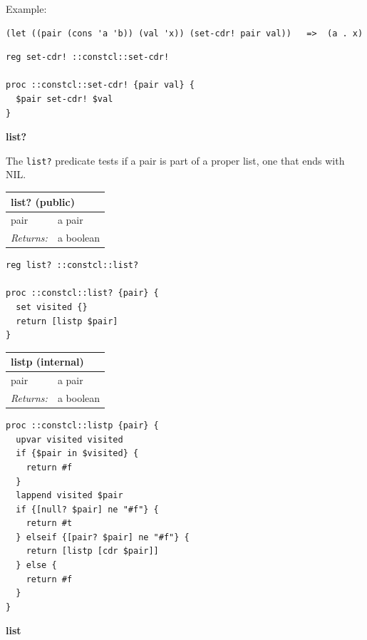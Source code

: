 \documentclass[twoside,9pt]{report}
\begin{document}
Example:

\noindent\makebox[\linewidth]{\rule{\linewidth}{0.4pt}}
\begin{lstlisting}
(let ((pair (cons 'a 'b)) (val 'x)) (set-cdr! pair val))   =>  (a . x)
\end{lstlisting}
\noindent\makebox[\linewidth]{\rule{\linewidth}{0.4pt}}
\noindent\makebox[\linewidth]{\rule{\linewidth}{0.4pt}}
\begin{lstlisting}
reg set-cdr! ::constcl::set-cdr!
 
proc ::constcl::set-cdr! {pair val} {
  $pair set-cdr! $val
}
\end{lstlisting}
\noindent\makebox[\linewidth]{\rule{\linewidth}{0.4pt}}

\textbf{list?}


The \texttt{list?} predicate tests if a pair is part of a proper list, one that ends with NIL.

\begin{tabular}{ |l l| }
\hline
\multicolumn{2}{|l|}{list? (public)} \\
\hline
pair & a pair \\
\textit{Returns:} & a boolean \\
\hline
\end{tabular}

\noindent\makebox[\linewidth]{\rule{\linewidth}{0.4pt}}
\begin{lstlisting}
reg list? ::constcl::list?
 
proc ::constcl::list? {pair} {
  set visited {}
  return [listp $pair]
}
\end{lstlisting}
\noindent\makebox[\linewidth]{\rule{\linewidth}{0.4pt}}
\begin{tabular}{ |l l| }
\hline
\multicolumn{2}{|l|}{listp (internal)} \\
\hline
pair & a pair \\
\textit{Returns:} & a boolean \\
\hline
\end{tabular}

\noindent\makebox[\linewidth]{\rule{\linewidth}{0.4pt}}
\begin{lstlisting}
proc ::constcl::listp {pair} {
  upvar visited visited
  if {$pair in $visited} {
    return #f
  }
  lappend visited $pair
  if {[null? $pair] ne "#f"} {
    return #t
  } elseif {[pair? $pair] ne "#f"} {
    return [listp [cdr $pair]]
  } else {
    return #f
  }
}
\end{lstlisting}
\noindent\makebox[\linewidth]{\rule{\linewidth}{0.4pt}}

\textbf{list}
\end{document}
